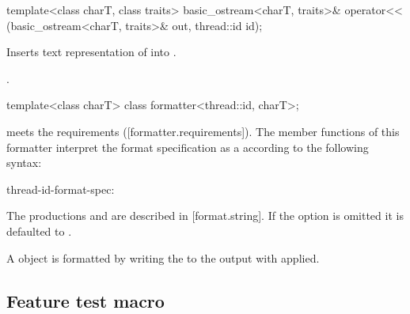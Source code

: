 \documentclass{wg21}
\begin{document}
%
\begin{itemdecl}
    template<class charT, class traits>
    basic_ostream<charT, traits>&
    operator<< (basic_ostream<charT, traits>& out, thread::id id);
\end{itemdecl}

\begin{itemdescr}
    \pnum
    \effects
    Inserts  text representation of  into
    . 

    \pnum
    \returns
    .
\end{itemdescr}

\begin{addedblock}

\begin{itemdecl}
template<class charT>
class formatter<thread::id, charT>;
\end{itemdecl}

\begin{itemdescr}
 meets the  requirements ([formatter.requirements]). The  member functions of this formatter interpret the format specification as a  according to the following syntax:

\begin{bnf}
thread-id-format-spec:\br
{} 	
\end{bnf}

The productions  and  are described in [format.string]. If the  option is omitted it is defaulted to \tcode{>}.

A  object is formatted by writing the  to the output with  applied.
\end{itemdescr}

\end{addedblock}

\subsection{Feature test macro}
\end{document}
